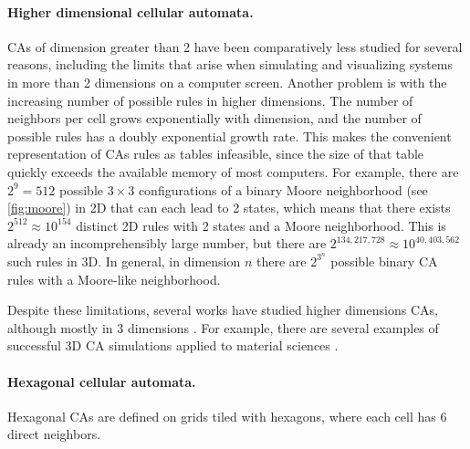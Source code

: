 \paragraph{Higher dimensional cellular automata.}
\acp{CA} of dimension greater than 2 have been comparatively less studied for
several reasons, including the limits that arise when simulating and visualizing
systems in more than 2 dimensions on a computer screen. Another problem is with
the increasing number of possible rules in higher dimensions. The number of
neighbors per cell grows exponentially with dimension, and the number of
possible rules has a doubly exponential growth rate. This makes the
convenient representation of \acp{CA} rules as tables infeasible, since the size
of that table quickly exceeds the available memory of most computers. For
example, there are $2^9 = 512$ possible $3\times 3$ configurations of a binary Moore neighborhood (see \ref{fig:moore}) in 2D that can each lead to 2 states, which means that there exists $2^{512} \approx 10^{154}$ distinct 2D rules with 2 states and a
Moore neighborhood. This is already an incomprehensibly large number, but there
are $2^{134,217,728} \approx 10^{40,403,562}$ such rules in 3D. In general, in dimension $n$ there are $2^{3^n}$ possible binary \ac{CA} rules with a Moore-like neighborhood.

Despite these limitations, several works have studied higher dimensions \acp{CA},
although mostly in 3 dimensions
\parencite{tsalidesThreedimensionalCellularAutomata1989,
  sudhakaranGrowing3DArtefacts2021}. For example, there are several examples of
successful 3D \ac{CA} simulations applied to material sciences
\parencite{gandin3DCellularAutomaton1997, arataFreeformShapeModeling1999,
  panStudyFailureScale2009, dicaprio3DCellularAutomata2016}.

\paragraph{Hexagonal cellular automata.}
Hexagonal \acp{CA} are defined on grids tiled with hexagons, where each
cell has 6 direct neighbors.

